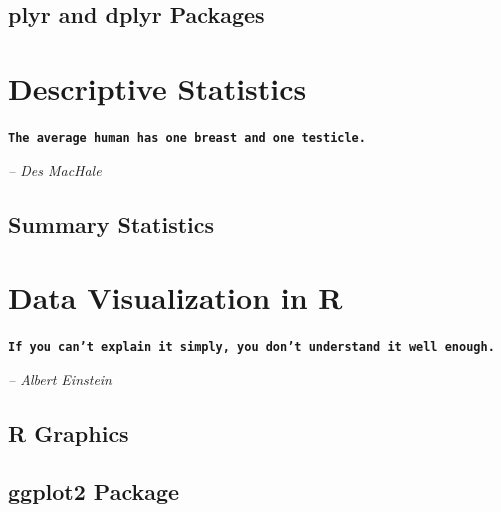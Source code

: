 \documentclass[11pt, letterpaper, twoside]{memoir}\usepackage{knitr}
\newcommand{\chapterendsymbol}{
    \vspace{24pt}
    \Huge
    \hrulefill \hspace{0.1in} \floweroneleft\floweroneright \hspace{0.1in} \hrulefill
    \normalsize
    }
\begin{document}
\section{plyr and dplyr Packages}

\chapterendsymbol





\chapter{Descriptive Statistics}

\begin{flushright}

\textbf{\texttt{The average human has one breast and one testicle.}}

\emph{-- Des MacHale}

\end{flushright}

\vspace{12pt}


\section{Summary Statistics}


\chapterendsymbol





\chapter{Data Visualization in R}

\begin{flushright}

\textbf{\texttt{If you can't explain it simply, you don't understand it well enough.}}

\emph{-- Albert Einstein}

\end{flushright}

\vspace{12pt}


\section{R Graphics}

\section{ggplot2 Package}
\end{document}
